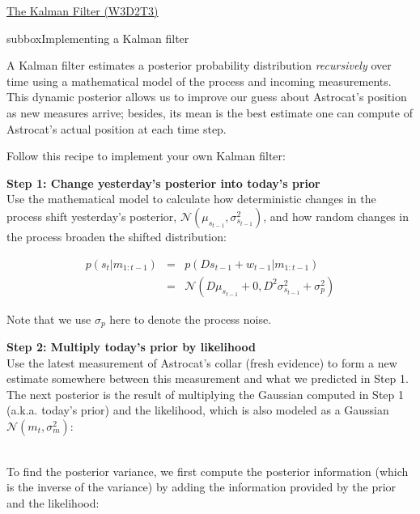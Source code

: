 \begin{textbox}{\href{http://instructor.compneuro.neuromatch.io/tutorials/W3D2_HiddenDynamics/instructor/W3D2_Tutorial3.html}{The Kalman Filter (W3D2T3)}   }

\begin{subbox}{subbox}{Implementing a Kalman filter}
\scriptsize

A Kalman filter estimates a posterior probability distribution \textit{recursively} over time using a mathematical model of the process and incoming measurements. This dynamic posterior allows us to improve our guess about Astrocat's position as new measures arrive; besides, its mean is the best estimate one can compute of Astrocat's actual position at each time step.

Follow this recipe to implement your own Kalman filter:

\textbf{Step 1: Change yesterday's posterior into today's prior}\\

Use the mathematical model to calculate how deterministic changes in the process shift yesterday's posterior, $\mathcal{N}(\mu_{s_{t-1}}, \sigma_{s_{t-1}}^2)$, and how random changes in the process broaden the shifted distribution:

\begin{align*}
p(s_t|m_{1:t-1}) &=& p(Ds_{t-1}+w_{t-1} | m_{1:t-1})\\ 
&=& \mathcal{N}(D\mu_{s_{t-1}} + 0, D^2\sigma_{s_{t-1}}^2 +\sigma_p^2)
\end{align*}

Note that we use $\sigma_p$ here to denote the process noise.

\textbf{Step 2: Multiply today's prior by likelihood} \\

Use the latest measurement of Astrocat's collar (fresh evidence) to form a new estimate somewhere between this measurement and what we predicted in Step 1. The next posterior is the result of multiplying the Gaussian computed in Step 1 (a.k.a. today's prior) and the likelihood, which is also modeled as a Gaussian $\mathcal{N}(m_t, \sigma_m^2)$:

\\

To find the posterior variance, we first compute the posterior information (which is the inverse of the variance) by adding the information provided by the prior and the likelihood:


\end{subbox}
\end{textbox}
